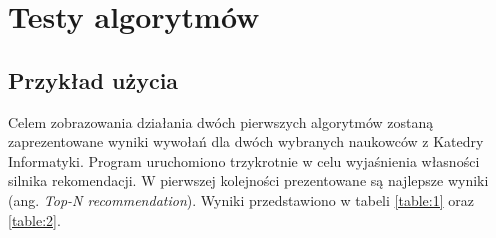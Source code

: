 \chapter{Testy algorytmów}
\thispagestyle{chapterBeginStyle}

\section{Przykład użycia}

Celem zobrazowania działania dwóch pierwszych algorytmów zostaną zaprezentowane wyniki wywołań dla dwóch wybranych naukowców z Katedry Informatyki. Program uruchomiono trzykrotnie w celu wyjaśnienia własności silnika rekomendacji. W pierwszej kolejności prezentowane są najlepsze wyniki (ang. \textit{Top-N recommendation}). Wyniki przedstawiono w tabeli \ref{table:1} oraz \ref{table:2}.

